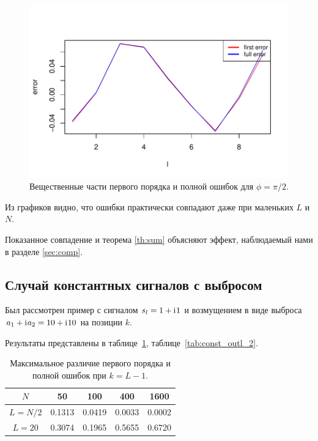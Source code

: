 \documentclass[specialist,
               substylefile = spbu.rtx,
               subf,href,colorlinks=true, 12pt]{disser}
\begin{document}
\begin{figure}[H]
	\begin{center}
		\includegraphics[width=0.6\linewidth]{img/first_vs_full_re_2.pdf}
		\caption{Вещественные части первого порядка и полной ошибок для $\phi = \pi / 2$.}
		\label{fig:harm_noise_pi_2}
	\end{center}
\end{figure}


Из графиков видно, что ошибки практически совпадают даже при маленьких $L$ и $N$.

Показанное совпадение и теорема \ref{th:sum} объясняют эффект, наблюдаемый нами в разделе \ref{sec:comp}.

\subsection{Случай константных сигналов с выбросом}

Был рассмотрен пример с сигналом $s_l = 1 + \mathrm{i}\mkern1mu 1$ и возмущением в виде выброса $a_1 + \mathrm{i}\mkern1mu a_2 = 10 + \mathrm{i}\mkern1mu 10$ на позиции $k$.

Результаты представлены в таблице~\ref{tab:const_outl_1}, таблице~\ref{tab:const_outl_2}.

\begin{table}[H]
	\begin{center}
		\caption{Максимальное различие первого порядка и полной ошибок при $k = L - 1$.}
		\label{tab:const_outl_1}
		\begin{tabular}{|c|c|c|c|c|}
			\hline
			$N$	& 50 & 100 & 400 & 1600 \\
			\hline
			$L = N / 2$ & 0.1313  & 0.0419  & 0.0033 & 0.0002 \\
			\hline
			$L = 20$ & 0.3074  & 0.1965  & 0.5655 & 0.6720 \\
			\hline
		\end{tabular}
	\end{center}
\end{table}
\end{document}
